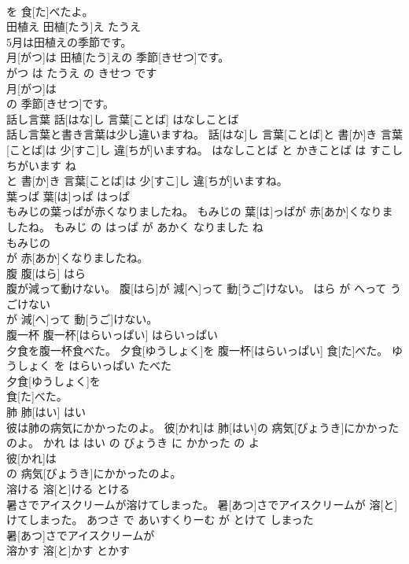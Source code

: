 \documentclass[8pt]{extreport}
\begin{document}
\begin{CJK}{UTF8}{min}
\\	を 食[た]べたよ。			
\\	田植え	田植[たう]え	たうえ	
\\	5月は田植えの季節です。	
\\	月[がつ]は 田植[たう]えの 季節[きせつ]です。	
\\	がつ は たうえ の きせつ です	
\\	月[がつ]は
\\	の 季節[きせつ]です。			
\\	話し言葉	話[はな]し 言葉[ことば]	はなしことば	
\\	話し言葉と書き言葉は少し違いますね。	話[はな]し 言葉[ことば]と 書[か]き 言葉[ことば]は 少[すこ]し 違[ちが]いますね。	はなしことば と かきことば は すこし ちがいます ね	
\\	と 書[か]き 言葉[ことば]は 少[すこ]し 違[ちが]いますね。			
\\	葉っぱ	葉[は]っぱ	はっぱ	
\\	もみじの葉っぱが赤くなりましたね。	もみじの 葉[は]っぱが 赤[あか]くなりましたね。	もみじ の はっぱ が あかく なりました ね	
\\	もみじの
\\	が 赤[あか]くなりましたね。			
\\	腹	腹[はら]	はら	
\\	腹が減って動けない。	腹[はら]が 減[へ]って 動[うご]けない。	はら が へって うごけない	
\\	が 減[へ]って 動[うご]けない。			
\\	腹一杯	腹一杯[はらいっぱい]	はらいっぱい	
\\	夕食を腹一杯食べた。	夕食[ゆうしょく]を 腹一杯[はらいっぱい] 食[た]べた。	ゆうしょく を はらいっぱい たべた	
\\	夕食[ゆうしょく]を
\\	食[た]べた。			
\\	肺	肺[はい]	はい	
\\	彼は肺の病気にかかったのよ。	彼[かれ]は 肺[はい]の 病気[びょうき]にかかったのよ。	かれ は はい の びょうき に かかった の よ	
\\	彼[かれ]は
\\	の 病気[びょうき]にかかったのよ。			
\\	溶ける	溶[と]ける	とける	
\\	暑さでアイスクリームが溶けてしまった。	暑[あつ]さでアイスクリームが 溶[と]けてしまった。	あつさ で あいすくりーむ が とけて しまった	
\\	暑[あつ]さでアイスクリームが
\\	溶かす	溶[と]かす	とかす	

\end{CJK}
\end{document}
